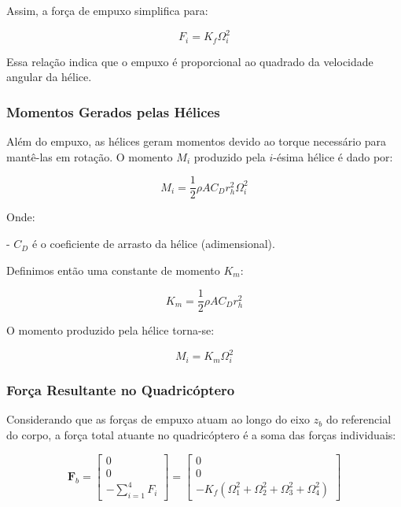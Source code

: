 Assim, a força de empuxo simplifica para:

\begin{equation}
F_i = K_f \Omega_i^2
\label{eq:forca_empuxo_simplificada}
\end{equation}

Essa relação indica que o empuxo é proporcional ao quadrado da velocidade angular da hélice.

\subsubsection{Momentos Gerados pelas Hélices}

Além do empuxo, as hélices geram momentos devido ao torque necessário para mantê-las em rotação. O momento \( M_i \) produzido pela \( i \)-ésima hélice é dado por:

\begin{equation}
M_i = \frac{1}{2} \rho A C_D r_h^2 \Omega_i^2
\label{eq:momento_helice}
\end{equation}

Onde:

- \( C_D \) é o coeficiente de arrasto da hélice (adimensional).

Definimos então uma constante de momento \( K_m \):

\begin{equation}
K_m = \frac{1}{2} \rho A C_D r_h^2
\label{eq:constante_momento}
\end{equation}

O momento produzido pela hélice torna-se:

\begin{equation}
M_i = K_m \Omega_i^2
\label{eq:momento_helice_simplificado}
\end{equation}

\subsubsection{Força Resultante no Quadricóptero}

Considerando que as forças de empuxo atuam ao longo do eixo \( z_b \) do referencial do corpo, a força total atuante no quadricóptero é a soma das forças individuais:

\begin{equation}
\mathbf{F}_b = \begin{bmatrix}
0 \\
0 \\
- \sum_{i=1}^{4} F_i
\end{bmatrix}
= \begin{bmatrix}
0 \\
0 \\
- K_f (\Omega_1^2 + \Omega_2^2 + \Omega_3^2 + \Omega_4^2)
\end{bmatrix}
\label{eq:forca_total_quadricoptero}
\end{equation}

